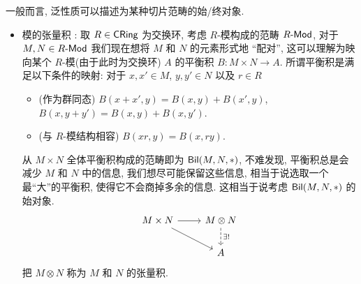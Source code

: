 一般而言, 泛性质可以描述为某种切片范畴的始/终对象.
\begin{example}
    \begin{itemize}
        \item 模的张量积 : 取 $R \in \mathsf{CRing}$ 为交换环, 考虑 $R$-模构成的范畴 $R\text{-}\mathsf{Mod}$, 对于 $M,N \in R\text{-}\mathsf{Mod}$ 我们现在想将 $M$ 和 $N$ 的元素形式地 ``配对'', 这可以理解为映向某个 $R$-模(由于此时为交换环) $A$ 的平衡积 $B \colon M \times N \to A$. 所谓平衡积是满足以下条件的映射: 对于 $x,x'\in M$, $y,y'\in N$ 以及 $r \in R$
        \begin{itemize}
            \item (作为群同态) $B(x+x',y) = B(x,y) + B(x',y)$, $B(x,y+y') = B(x,y) + B(x,y')$.
            \item (与 $R$-模结构相容) $B(xr,y) = B(x,ry)$.
        \end{itemize}
        从 $M\times N$ 全体平衡积构成的范畴即为 $\mathsf{Bil}(M,N,*)$, 不难发现, 平衡积总是会减少 $M$ 和 $N$ 中的信息, 我们想尽可能保留这些信息, 相当于说选取一个最``大''的平衡积, 使得它不会商掉多余的信息.
        这相当于说考虑 $\mathsf{Bil}(M,N,*)$ 的始对象. 
        \[\begin{tikzcd}
	{M\times N} & {M\otimes N} \\
	& A
	\arrow[from=1-1, to=1-2]
	\arrow[from=1-1, to=2-2]
	\arrow["{\exists !}", dashed, from=1-2, to=2-2]
        \end{tikzcd}\]
        把 $M\otimes N$ 称为 $M$ 和 $N$ 的张量积.
    \end{itemize}
\end{example}
